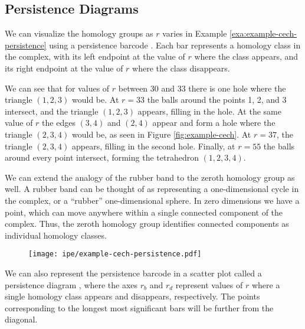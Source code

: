 \subsection{Persistence Diagrams}

We can visualize the homology groups as \(r\) varies in Example \ref{exa:example-cech-persistence} using a persistence barcode .
Each bar represents a homology class in the complex, with its left endpoint at the value of \(r\) where the class appears, and its right endpoint at the value of \(r\) where the class disappears.

We can see that for values of \(r\) between 30 and 33 there is one hole where the triangle \((1,2,3)\) would be.
At \(r=33\) the balls around the points 1, 2, and 3 intersect, and the triangle \((1,2,3)\) appears, filling in the hole.
At the same value of \(r\) the edges \((3,4)\) and \((2,4)\) appear and form a hole where the triangle \((2,3,4)\) would be, as seen in Figure \ref{fig:example-cech}.
At \(r=37\), the triangle \((2,3,4)\) appears, filling in the second hole.
Finally, at \(r=55\) the balls around every point intersect, forming the tetrahedron \((1,2,3,4)\).

We can extend the analogy of the rubber band to the zeroth homology group as well.
A rubber band can be thought of as representing a one-dimensional cycle in the complex, or a ``rubber'' one-dimensional sphere.
In zero dimensions we have a point, which can move anywhere within a single connected component of the complex.
Thus, the zeroth homology group identifies connected components as individual homology classes.

\begin{figure}
    \centering
    \texttt{[image: ipe/example-cech-persistence.pdf]}
    \caption{}
    \label{fig:example-cech-persistence}
\end{figure}

We can also represent the persistence barcode in a scatter plot called a persistence diagram , where the axes \(r_b\) and \(r_d\) represent values of \(r\) where a single homology class appears and disappears, respectively.
The points corresponding to the longest most significant bars will be further from the diagonal.

